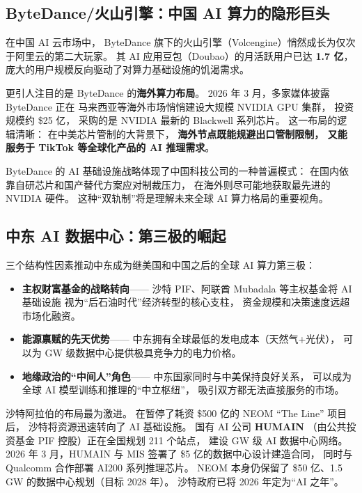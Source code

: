 \subsection{ByteDance/火山引擎：中国 AI 算力的隐形巨头}
\label{subsec:bytedance-infra}

在中国 AI 云市场中，
ByteDance 旗下的火山引擎（Volcengine）悄然成长为仅次于阿里云的第二大玩家。
其 AI 应用豆包（Doubao）的月活跃用户已达 \textbf{1.7 亿}，
庞大的用户规模反向驱动了对算力基础设施的饥渴需求。

更引人注目的是 ByteDance 的\textbf{海外算力布局}。
2026 年 3 月，多家媒体披露 ByteDance 正在
马来西亚等海外市场悄悄建设大规模 NVIDIA GPU 集群，
投资规模约 \$25 亿，
采购的是 NVIDIA 最新的 Blackwell 系列芯片。
这一布局的逻辑清晰：
在中美芯片管制的大背景下，
\textbf{海外节点既能规避出口管制限制，
又能服务于 TikTok 等全球化产品的 AI 推理需求}。

ByteDance 的 AI 基础设施战略体现了中国科技公司的一种普遍模式：
在国内依靠自研芯片和国产替代方案应对制裁压力，
在海外则尽可能地获取最先进的 NVIDIA 硬件。
这种``双轨制''将是理解未来全球 AI 算力格局的重要视角。

\subsection{中东 AI 数据中心：第三极的崛起}
\label{subsec:middle-east-dc}

\begin{whybox}
三个结构性因素推动中东成为继美国和中国之后的全球 AI 算力第三极：
\begin{itemize}[noitemsep]
  \item \textbf{主权财富基金的战略转向}——
        沙特 PIF、阿联酋 Mubadala 等主权基金将 AI 基础设施
        视为``后石油时代''经济转型的核心支柱，
        资金规模和决策速度远超市场化融资。
  \item \textbf{能源禀赋的先天优势}——
        中东拥有全球最低的发电成本（天然气+光伏），
        可以为 GW 级数据中心提供极具竞争力的电力价格。
  \item \textbf{地缘政治的``中间人''角色}——
        中东国家同时与中美保持良好关系，
        可以成为全球 AI 模型训练和推理的``中立枢纽''，
        吸引双方都无法直接服务的市场。
\end{itemize}
\end{whybox}

沙特阿拉伯的布局最为激进。
在暂停了耗资 \$500 亿的 NEOM ``The Line'' 项目后，
沙特将资源迅速转向了 AI 基础设施。
国有 AI 公司 \textbf{HUMAIN}
（由公共投资基金 PIF 控股）正在全国规划 211 个站点，
建设 GW 级 AI 数据中心网络。
2026 年 3 月，HUMAIN 与 MIS 签署了 \$5 亿的数据中心设计建造合同，
同时与 Qualcomm 合作部署 AI200 系列推理芯片。
NEOM 本身仍保留了 \$50 亿、1.5\,GW 的数据中心规划（目标 2028 年）。
沙特政府已将 2026 年定为``AI 之年''。

